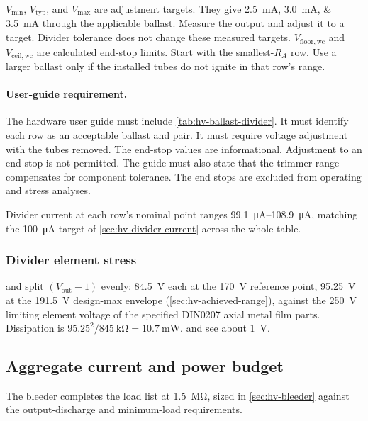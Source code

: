 $V_{\min}$, $V_{\mathrm{typ}}$, and $V_{\mathrm{max}}$ are adjustment targets.
They give \SIlist{2.5;3.0;3.5}{\milli\ampere} through the applicable ballast.
Measure the output and adjust it to a target. Divider tolerance does not change
these measured targets. $V_{\mathrm{floor,wc}}$ and
$V_{\mathrm{ceil,wc}}$ are calculated end-stop limits. Start with the
smallest-$R_A$ row. Use a larger ballast only if the installed tubes do not
ignite in that row's range.

\paragraph{User-guide requirement.} The hardware user guide must include
\cref{tab:hv-ballast-divider}. It must identify each row as an acceptable
ballast and  pair. It must require voltage adjustment with the
tubes removed. The end-stop values are informational. Adjustment to an end stop
is not permitted. The guide must also state that the trimmer range compensates
for component tolerance. The end stops are excluded from operating and stress
analyses.

Divider current at each row's nominal point ranges
\SIrange{99.1}{108.9}{\micro\ampere}, matching the \SI{100}{\micro\ampere}
target of \cref{sec:hv-divider-current} across the whole table.

\subsubsection{Divider element stress}\label{sec:hv-divider-stress}

 and  split $(V_{\mathrm{out}}-1)$ evenly:
\SI{84.5}{\volt} each at the \SI{170}{\volt} reference point, \SI{95.25}{\volt}
at the \SI{191.5}{\volt} design-max envelope (\cref{sec:hv-achieved-range}),
against the \SI{250}{\volt} limiting element voltage of the specified DIN0207
axial metal film parts. Dissipation is $95.25^2/\SI{845}{\kilo\ohm} =
\SI{10.7}{\milli\watt}$.  and  see about
\SI{1}{\volt}.

\subsection{Aggregate current and power budget}\label{sec:hv-budget}

The bleeder  completes the load list at \SI{1.5}{\mega\ohm},
sized in \cref{sec:hv-bleeder} against the output-discharge and minimum-load
requirements.

